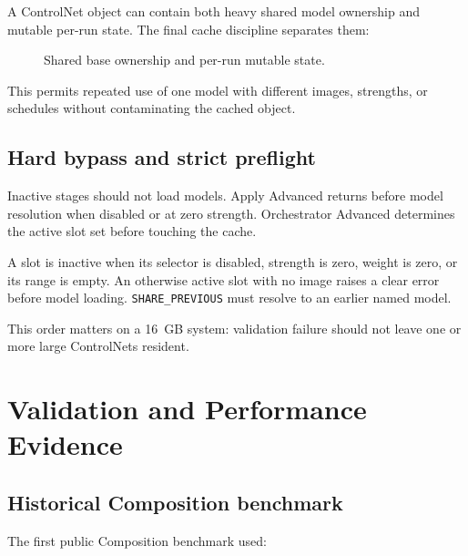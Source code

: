 \documentclass[11pt]{article}
\newcommand{\code}[1]{\texttt{#1}}
\begin{document}
A ControlNet object can contain both heavy shared model ownership and mutable per-run state. The final cache discipline separates them:

\begin{figure}[H]
\centering
{}
\caption{Shared base ownership and per-run mutable state.}
\end{figure}

This permits repeated use of one model with different images, strengths, or schedules without contaminating the cached object.

\subsection{Hard bypass and strict preflight}

Inactive stages should not load models. Apply Advanced returns before model resolution when disabled or at zero strength. Orchestrator Advanced determines the active slot set before touching the cache.

A slot is inactive when its selector is disabled, strength is zero, weight is zero, or its range is empty. An otherwise active slot with no image raises a clear error before model loading. \code{SHARE\_PREVIOUS} must resolve to an earlier named model.

This order matters on a 16~GB system: validation failure should not leave one or more large ControlNets resident.

\section{Validation and Performance Evidence}

\subsection{Historical Composition benchmark}

The first public Composition benchmark used:
\end{document}
